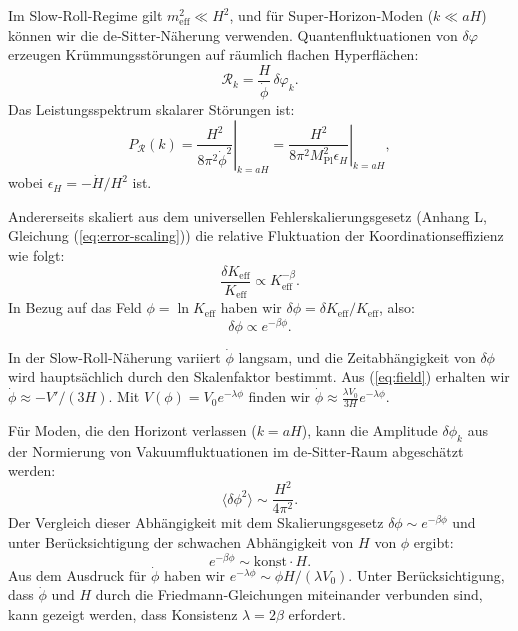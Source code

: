 \documentclass[12pt]{article}
\theoremstyle{remark}
\newcommand{\Keff}{K_{\mathrm{eff}}}
\newcommand{\Mpl}{M_{\mathrm{Pl}}}
\begin{document}
	Im Slow‑Roll‑Regime gilt $m_{\mathrm{eff}}^2 \ll H^2$, und für Super‑Horizon‑Moden ($k \ll aH$) können wir die de‑Sitter‑Näherung verwenden. Quantenfluktuationen von $\delta\varphi$ erzeugen Krümmungsstörungen auf räumlich flachen Hyperflächen:
	\begin{equation}
		\mathcal{R}_k = \frac{H}{\dot{\phi}} \, \delta\varphi_k.
	\end{equation}
	Das Leistungsspektrum skalarer Störungen ist:
	\begin{equation}
		P_{\mathcal{R}}(k) = \left. \frac{H^2}{8\pi^2 \dot{\phi}^2} \right|_{k=aH} = \left. \frac{H^2}{8\pi^2 \Mpl^2 \epsilon_H} \right|_{k=aH},
	\end{equation}
	wobei $\epsilon_H = -\dot{H}/H^2$ ist.
	
	Andererseits skaliert aus dem universellen Fehlerskalierungsgesetz (Anhang L, Gleichung (\ref{eq:error-scaling})) die relative Fluktuation der Koordinationseffizienz wie folgt:
	\begin{equation}
		\frac{\delta\Keff}{\Keff} \propto \Keff^{-\beta}.
	\end{equation}
	In Bezug auf das Feld $\phi = \ln\Keff$ haben wir $\delta\phi = \delta\Keff/\Keff$, also:
	\begin{equation}
		\delta\phi \propto e^{-\beta\phi}.
	\end{equation}
	
	In der Slow‑Roll‑Näherung variiert $\dot{\phi}$ langsam, und die Zeitabhängigkeit von $\delta\phi$ wird hauptsächlich durch den Skalenfaktor bestimmt. Aus (\ref{eq:field}) erhalten wir $\dot{\phi} \approx -V'/(3H)$. Mit $V(\phi) = V_0 e^{-\lambda\phi}$ finden wir $\dot{\phi} \approx \frac{\lambda V_0}{3H} e^{-\lambda\phi}$.
	
	Für Moden, die den Horizont verlassen ($k = aH$), kann die Amplitude $\delta\phi_k$ aus der Normierung von Vakuumfluktuationen im de‑Sitter‑Raum abgeschätzt werden:
	\begin{equation}
		\langle \delta\phi^2 \rangle \sim \frac{H^2}{4\pi^2}.
	\end{equation}
	Der Vergleich dieser Abhängigkeit mit dem Skalierungsgesetz $\delta\phi \sim e^{-\beta\phi}$ und unter Berücksichtigung der schwachen Abhängigkeit von $H$ von $\phi$ ergibt:
	\begin{equation}
		e^{-\beta\phi} \sim \text{konst} \cdot H.
	\end{equation}
	Aus dem Ausdruck für $\dot{\phi}$ haben wir $e^{-\lambda\phi} \sim \dot{\phi} H / (\lambda V_0)$. Unter Berücksichtigung, dass $\dot{\phi}$ und $H$ durch die Friedmann‑Gleichungen miteinander verbunden sind, kann gezeigt werden, dass Konsistenz $\lambda = 2\beta$ erfordert.
	
\end{document}
